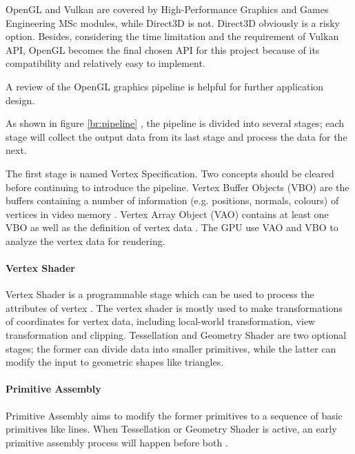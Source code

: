 OpenGL and Vulkan are covered by High-Performance Graphics and Games Engineering MSc modules, while Direct3D is not. Direct3D obviously is a risky option. Besides, considering the time limitation and the requirement of Vulkan API, OpenGL becomes the final chosen API for this project because of its compatibility and relatively easy to implement.

\hspace*{\fill}

A review of the OpenGL graphics pipeline is helpful for further application design.

\hspace*{\fill}

As shown in figure \ref{br:pipeline} \cite{learopengl}, the pipeline is divided into several stages; each stage will collect the output data from its last stage and process the data for the next.

The first stage is named Vertex Specification. Two concepts should be cleared before continuing to introduce the pipeline. Vertex Buffer Objects (VBO) are the buffers containing a number of information (e.g. positions, normals, colours) of vertices in video memory \cite{vetspeci}. Vertex Array Object (VAO) contains at least one VBO as well as the definition of vertex data \cite{vetspeci}. The GPU use VAO and VBO to analyze the vertex data for rendering.

\paragraph{Vertex Shader}

Vertex Shader is a programmable stage which can be used to process the attributes of vertex \cite{vetsha}. The vertex shader is mostly used to make transformations of coordinates for vertex data, including local-world transformation, view transformation and clipping. Tessellation \cite{tesse} and Geometry Shader \cite{gs} are two optional stages; the former can divide data into smaller primitives, while the latter can modify the input to geometric shapes like triangles.

\paragraph{Primitive Assembly}

Primitive Assembly \cite{pa} aims to modify the former primitives to a sequence of basic primitives like lines. When Tessellation or Geometry Shader is active, an early primitive assembly process will happen before both \cite{vetsha}.

